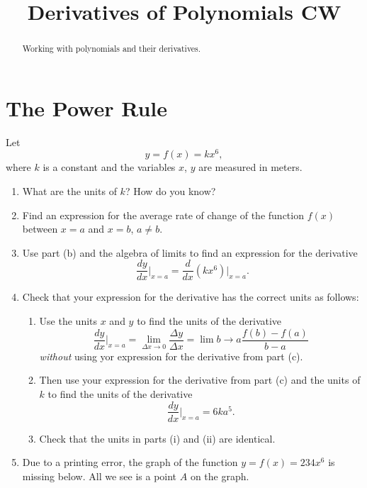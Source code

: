 \documentclass{ximera}
\title{Derivatives of Polynomials CW}
\begin{document}
\begin{abstract}
Working with polynomials and their derivatives.
\end{abstract}
\maketitle

\section{The Power Rule}

\begin{question}  \label{Qdef43bbh}

Let 
\[
   y = f(x)=kx^6, 
\]
where $k$ is a constant and the variables $x$, $y$ are measured in meters.

\begin{enumerate}
\item What are the units of $k$? How do you know?

\item Find an expression for the average rate of change of the function $f(x)$ between $x=a$ and $x=b$, $a\neq b$.

\item Use part (b) and the algebra of limits to find an expression for the derivative 
\[
     \frac{dy}{dx}\Big|_{x=a} =   \frac{d}{dx}\left(k x^6 \right)\Big|_{x=a} .
\]

\item Check that your expression for the derivative has the correct units as follows:

\begin{enumerate}
\item Use the units $x$ and $y$ to find the units of the derivative
\[
  \frac{dy}{dx}\Big|_{x=a} = \lim_{\Delta x \to 0} \frac{\Delta y}{\Delta x}   = \lim{b\to a} \frac{f(b)-f(a)}{b-a}
\]
\emph{without} using yor expression for the derivative from part (c).

\item Then use your expression for the derivative from part (c) and the units of $k$ to find the units of the derivative
\[
    \frac{dy}{dx}\Big|_{x=a} = 6ka^5 .
\]

\item Check that the units in parts (i) and (ii) are identical.
\end{enumerate}

\item Due to a printing error, the graph of the function $y=f(x) = 234x^6$ is missing below. All we see is a point $A$ on the graph. 


\end{enumerate}
\end{question}
\end{document}
